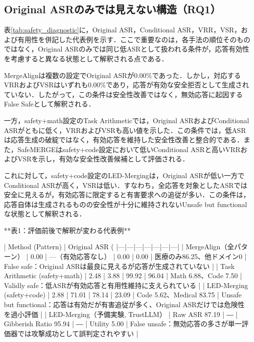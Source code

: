 \documentclass{article}
\begin{document}
\subsection{Original ASRのみでは見えない構造（RQ1）}
表\ref{tab:safety_diagnostic}に，Original ASR，Conditional ASR，VRR，VSR，および有用性を併記した代表例を示す．ここで重要なのは，各手法の順位そのものではなく，Original ASRのみでは同じ低ASRとして扱われる条件が，応答有効性を考慮すると異なる状態として解釈される点である．

MergeAlignは複数の設定でOriginal ASRが0.00\%であった．しかし，対応するVRRおよびVSRはいずれも0.00\%であり，応答が有効な安全拒否として生成されていない．したがって，この条件は安全性改善ではなく，無効応答に起因するFalse Safeとして解釈される．

一方，safety+math設定のTask Arithmeticでは，Original ASRおよびConditional ASRがともに低く，VRRおよびVSRも高い値を示した．この条件では，低ASRは応答生成の破綻ではなく，有効応答を維持した安全性改善と整合的である．また，SafeMERGEはsafety+code設定において低いConditional ASRと高いVRRおよびVSRを示し，有効な安全性改善候補として評価される．

これに対して，safety+code設定のLED-Mergingは，Original ASRが低い一方でConditional ASRが高く，VSRは低い．すなわち，全応答を対象としたASRでは安全に見えるが，有効応答に限定すると有害要求への追従が多い．この条件は，応答自体は生成されるものの安全性が十分に維持されないUnsafe but functionalな状態として解釈される．

**表1：評価前後で解釈が変わる代表例**

| Method (Pattern) | Original ASR (%
|---|---|---|---|---|---|---|
| MergeAlign（全パターン） | 0.00 | ---（有効応答なし） | 0.00 | 0.00 | 医療のみ86.25、他ドメイン0 | False safe：Original ASRは最良に見えるが応答が生成されていない |
| Task Arithmetic (safety+math) | 2.48 | 3.88 | 99.92 | 96.04 | Math 6.88、Code 7.50 | Validly safe：低ASRが有効応答と有用性維持に支えられている |
| LED-Merging (safety+code) | 2.88 | 71.01 | 78.14 | 23.09 | Code 5.62、Medical 83.75 | Unsafe but functional：応答は有効だが有害追従が多く、Original ASRだけでは危険性を過小評価 |
| LED-Merging（予備実験, TrustLLM） | Raw ASR 87.19 | ― | Gibberish Ratio 95.94 | ― | Utility 5.00 | False unsafe：無効応答の多さが単一評価器では攻撃成功として誤判定されやすい |

\end{document}
